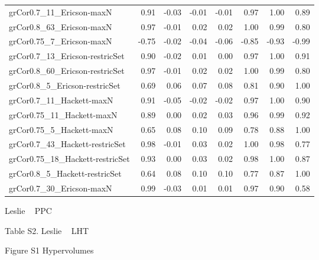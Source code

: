 {\begin{landscape}
\begin{footnotesize}
\begin{longtable}{@{}l|rrrrrrr@{}}
grCor0.7\_11\_Ericson-maxN        & 0.91 & -0.03 & -0.01 & -0.01 & 0.97 & 1.00 & 0.89\tabularnewline
grCor0.8\_63\_Ericson-maxN        & 0.97 & -0.01 & 0.02 & 0.02 & 1.00 & 0.99 & 0.80\tabularnewline
grCor0.75\_7\_Ericson-maxN        & -0.75 & -0.02 & -0.04 & -0.06 & -0.85 & -0.93 & -0.99\tabularnewline
grCor0.7\_13\_Ericson-restricSet  & 0.90 & -0.02 & 0.01 & 0.00 & 0.97 & 1.00 & 0.91\tabularnewline
grCor0.8\_60\_Ericson-restricSet  & 0.97 & -0.01 & 0.02 & 0.02 & 1.00 & 0.99 & 0.80\tabularnewline
grCor0.8\_5\_Ericson-restricSet   & 0.69 & 0.06 & 0.07 & 0.08 & 0.81 & 0.90 & 1.00\tabularnewline
grCor0.7\_11\_Hackett-maxN        & 0.91 & -0.05 & -0.02 & -0.02 & 0.97 & 1.00 & 0.90\tabularnewline
grCor0.75\_11\_Hackett-maxN       & 0.89 & 0.00 & 0.02 & 0.03 & 0.96 & 0.99 & 0.92\tabularnewline
grCor0.75\_5\_Hackett-maxN        & 0.65 & 0.08 & 0.10 & 0.09 & 0.78 & 0.88 & 1.00\tabularnewline
grCor0.7\_43\_Hackett-restricSet  & 0.98 & -0.01 & 0.03 & 0.02 & 1.00 & 0.98 & 0.77\tabularnewline
grCor0.75\_18\_Hackett-restricSet & 0.93 & 0.00 & 0.03 & 0.02 & 0.98 & 1.00 & 0.87\tabularnewline
grCor0.8\_5\_Hackett-restricSet   & 0.64 & 0.08 & 0.10 & 0.10 & 0.77 & 0.87 & 1.00\tabularnewline
grCor0.7\_30\_Ericson-maxN        & 0.99 & -0.03 & 0.01 & 0.01 & 0.97 & 0.90 & 0.58\tabularnewline
\bottomrule
\end{longtable}
\end{footnotesize}
\end{landscape}
\clearpage%
}




Leslie ~ PPC

Table S2. Leslie ~ LHT

Figure S1 Hypervolumes
